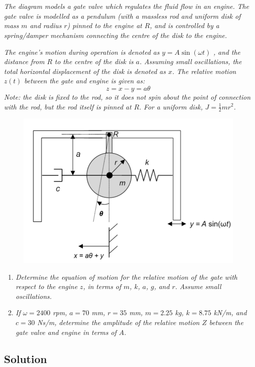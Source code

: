 \section{}
\textit{
The diagram models a gate valve which regulates the fluid flow in an engine. The gate valve is
modelled as a pendulum (with a massless rod and uniform disk of mass $m$ and radius $r$) pinned
to the engine at $R$, and is controlled by a spring/damper mechanism connecting the centre of the
disk to the engine.}

\textit{
    The engine's motion during operation is denoted as $y = A \sin (\omega t)$ , and the distance from $R$
    to the centre of the disk is $a$. Assuming small oscillations, the total horizontal displacement of
    the disk is denoted as $x$. The relative motion $z(t)$ between the gate and engine is given as:}
\[z = x - y = a\theta\]
\textit{Note: the disk is fixed to the rod, so it does not spin about the point of connection with the rod,
but the rod itself is pinned at $R$. For a uniform disk, $J = \frac{1}{2} m r^2$.}

\begin{figure}[H]
    \centering
    \includegraphics[width=0.5\linewidth]{Questions/Figures/Q1 Problem Diagram.png}
\end{figure}

\begin{enumerate}[label=(\alph*)]
    \item \textit{Determine the equation of motion for the relative motion of the gate with respect
    to the engine $z$, in terms of $m$, $k$, $a$, $g$, and $r$. Assume small oscillations.}
    \item \textit{If $\omega = 2400$ rpm, $a = 70$ mm, $r = 35$ mm, $m = 2.25$ kg, $k = 8.75$ kN/m, and
    $c = 30$ Ns/m, determine the amplitude of the relative motion $Z$ between the gate valve
    and engine in terms of $A$.}
\end{enumerate}

\subsection*{Solution}
